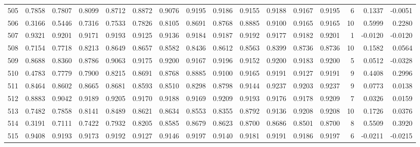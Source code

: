 \begin{tabular}{lrrrrrrrrrrrrrrr}
505 &      0.7858 &  0.7807 &  0.8099 &  0.8712 &  0.8872 &  0.9076 &  0.9195 &  0.9186 &  0.9155 &  0.9188 &   0.9167 &     0.9195 &      6 &                    0.1337 &                    -0.0051 \\
506 &      0.3166 &  0.5446 &  0.7316 &  0.7533 &  0.7826 &  0.8105 &  0.8691 &  0.8768 &  0.8885 &  0.9100 &   0.9165 &     0.9165 &     10 &                    0.5999 &                     0.2280 \\
507 &      0.9321 &  0.9201 &  0.9171 &  0.9193 &  0.9125 &  0.9136 &  0.9184 &  0.9187 &  0.9192 &  0.9177 &   0.9182 &     0.9201 &      1 &                   -0.0120 &                    -0.0120 \\
508 &      0.7154 &  0.7718 &  0.8213 &  0.8649 &  0.8657 &  0.8582 &  0.8436 &  0.8612 &  0.8563 &  0.8399 &   0.8736 &     0.8736 &     10 &                    0.1582 &                     0.0564 \\
509 &      0.8688 &  0.8360 &  0.8786 &  0.9063 &  0.9175 &  0.9200 &  0.9167 &  0.9196 &  0.9152 &  0.9200 &   0.9183 &     0.9200 &      5 &                    0.0512 &                    -0.0328 \\
510 &      0.4783 &  0.7779 &  0.7900 &  0.8215 &  0.8691 &  0.8768 &  0.8885 &  0.9100 &  0.9165 &  0.9191 &   0.9127 &     0.9191 &      9 &                    0.4408 &                     0.2996 \\
511 &      0.8464 &  0.8602 &  0.8665 &  0.8681 &  0.8593 &  0.8510 &  0.8298 &  0.8798 &  0.9144 &  0.9237 &   0.9203 &     0.9237 &      9 &                    0.0773 &                     0.0138 \\
512 &      0.8883 &  0.9042 &  0.9189 &  0.9205 &  0.9170 &  0.9188 &  0.9169 &  0.9209 &  0.9193 &  0.9176 &   0.9178 &     0.9209 &      7 &                    0.0326 &                     0.0159 \\
513 &      0.7482 &  0.7858 &  0.8141 &  0.8489 &  0.8621 &  0.8634 &  0.8553 &  0.8355 &  0.8792 &  0.9136 &   0.9208 &     0.9208 &     10 &                    0.1726 &                     0.0376 \\
514 &      0.3191 &  0.7111 &  0.7422 &  0.7932 &  0.8205 &  0.8585 &  0.8679 &  0.8623 &  0.8700 &  0.8686 &   0.8501 &     0.8700 &      8 &                    0.5509 &                     0.3920 \\
515 &      0.9408 &  0.9193 &  0.9173 &  0.9192 &  0.9127 &  0.9146 &  0.9197 &  0.9140 &  0.9181 &  0.9191 &   0.9186 &     0.9197 &      6 &                   -0.0211 &                    -0.0215 \\

\end{tabular}

